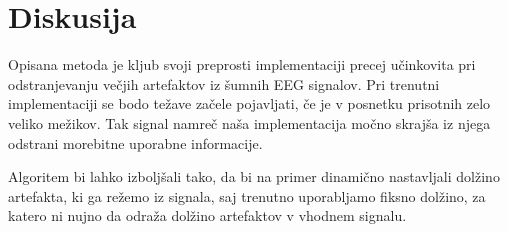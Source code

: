 \documentclass[9pt]{IEEEtran}
\begin{document}
\section{Diskusija}

Opisana metoda je kljub svoji preprosti implementaciji precej učinkovita pri odstranjevanju večjih artefaktov iz šumnih EEG signalov. Pri trenutni implementaciji se bodo težave začele pojavljati, če je v posnetku prisotnih zelo veliko mežikov. Tak signal namreč naša implementacija močno skrajša iz njega odstrani morebitne uporabne informacije.

Algoritem bi lahko izboljšali tako, da bi na primer dinamično nastavljali dolžino artefakta, ki ga režemo iz signala, saj trenutno uporabljamo fiksno dolžino, za katero ni nujno da odraža dolžino artefaktov v vhodnem signalu.




\end{document}

